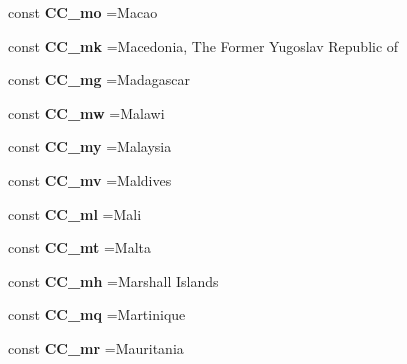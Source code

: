 \begin{DoxyCompactItemize}
const {\bfseries C\+C\+\_\+mo} =\textquotesingle{}Macao\textquotesingle{}
\item 
\hypertarget{class_i_s_o_a0389108c4b95ddbb7683eed371a15448}{}\label{class_i_s_o_a0389108c4b95ddbb7683eed371a15448} 
const {\bfseries C\+C\+\_\+mk} =\textquotesingle{}Macedonia, The Former Yugoslav Republic of\textquotesingle{}
\item 
\hypertarget{class_i_s_o_ade2e1a9e55a8fc4bb57ad23d79d434b4}{}\label{class_i_s_o_ade2e1a9e55a8fc4bb57ad23d79d434b4} 
const {\bfseries C\+C\+\_\+mg} =\textquotesingle{}Madagascar\textquotesingle{}
\item 
\hypertarget{class_i_s_o_a58c0262198275e86c7cd53cd3f04ed42}{}\label{class_i_s_o_a58c0262198275e86c7cd53cd3f04ed42} 
const {\bfseries C\+C\+\_\+mw} =\textquotesingle{}Malawi\textquotesingle{}
\item 
\hypertarget{class_i_s_o_a00aeeae97f72220268b9918380fcc2c1}{}\label{class_i_s_o_a00aeeae97f72220268b9918380fcc2c1} 
const {\bfseries C\+C\+\_\+my} =\textquotesingle{}Malaysia\textquotesingle{}
\item 
\hypertarget{class_i_s_o_a697a09ccd98e8b7bfab980c0c37bba14}{}\label{class_i_s_o_a697a09ccd98e8b7bfab980c0c37bba14} 
const {\bfseries C\+C\+\_\+mv} =\textquotesingle{}Maldives\textquotesingle{}
\item 
\hypertarget{class_i_s_o_afc093677d4a464dc7bf86d14f43fcf53}{}\label{class_i_s_o_afc093677d4a464dc7bf86d14f43fcf53} 
const {\bfseries C\+C\+\_\+ml} =\textquotesingle{}Mali\textquotesingle{}
\item 
\hypertarget{class_i_s_o_a3c077169a73c53a6a457c0790820eed6}{}\label{class_i_s_o_a3c077169a73c53a6a457c0790820eed6} 
const {\bfseries C\+C\+\_\+mt} =\textquotesingle{}Malta\textquotesingle{}
\item 
\hypertarget{class_i_s_o_a300502bbfaabe24cd1c894765133cabd}{}\label{class_i_s_o_a300502bbfaabe24cd1c894765133cabd} 
const {\bfseries C\+C\+\_\+mh} =\textquotesingle{}Marshall Islands\textquotesingle{}
\item 
\hypertarget{class_i_s_o_a91c5e622a8c9f5cc8fce42d067184aad}{}\label{class_i_s_o_a91c5e622a8c9f5cc8fce42d067184aad} 
const {\bfseries C\+C\+\_\+mq} =\textquotesingle{}Martinique\textquotesingle{}
\item 
\hypertarget{class_i_s_o_acd01ce87ad7b97cfa639a64965171cf0}{}\label{class_i_s_o_acd01ce87ad7b97cfa639a64965171cf0} 
const {\bfseries C\+C\+\_\+mr} =\textquotesingle{}Mauritania\textquotesingle{}
\item 
\hypertarget{class_i_s_o_ac8c69b3530e24ed8aa13e2a84bca0297}{}\label{class_i_s_o_ac8c69b3530e24ed8aa13e2a84bca0297} 

\end{DoxyCompactItemize}
